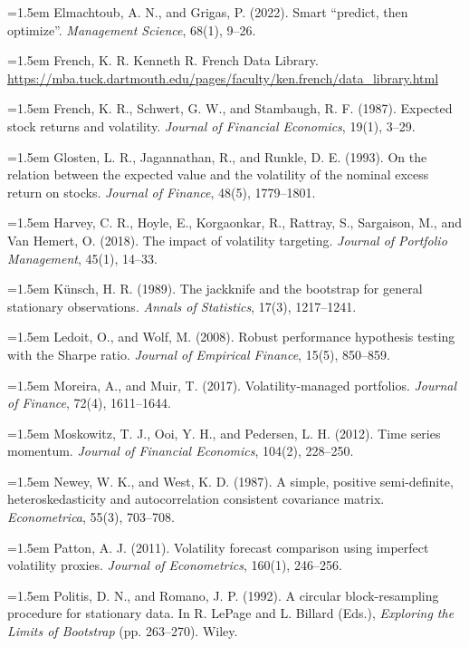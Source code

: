 \hangindent=1.5em Elmachtoub, A. N., and Grigas, P. (2022). Smart ``predict, then optimize''. \textit{Management Science}, 68(1), 9--26.\par\smallskip
\hangindent=1.5em French, K. R. Kenneth R. French Data Library. \url{https://mba.tuck.dartmouth.edu/pages/faculty/ken.french/data_library.html}\par\smallskip
\hangindent=1.5em French, K. R., Schwert, G. W., and Stambaugh, R. F. (1987). Expected stock returns and volatility. \textit{Journal of Financial Economics}, 19(1), 3--29.\par\smallskip
\hangindent=1.5em Glosten, L. R., Jagannathan, R., and Runkle, D. E. (1993). On the relation between the expected value and the volatility of the nominal excess return on stocks. \textit{Journal of Finance}, 48(5), 1779--1801.\par\smallskip
\hangindent=1.5em Harvey, C. R., Hoyle, E., Korgaonkar, R., Rattray, S., Sargaison, M., and Van Hemert, O. (2018). The impact of volatility targeting. \textit{Journal of Portfolio Management}, 45(1), 14--33.\par\smallskip
\hangindent=1.5em Künsch, H. R. (1989). The jackknife and the bootstrap for general stationary observations. \textit{Annals of Statistics}, 17(3), 1217--1241.\par\smallskip
\hangindent=1.5em Ledoit, O., and Wolf, M. (2008). Robust performance hypothesis testing with the Sharpe ratio. \textit{Journal of Empirical Finance}, 15(5), 850--859.\par\smallskip
\hangindent=1.5em Moreira, A., and Muir, T. (2017). Volatility-managed portfolios. \textit{Journal of Finance}, 72(4), 1611--1644.\par\smallskip
\hangindent=1.5em Moskowitz, T. J., Ooi, Y. H., and Pedersen, L. H. (2012). Time series momentum. \textit{Journal of Financial Economics}, 104(2), 228--250.\par\smallskip
\hangindent=1.5em Newey, W. K., and West, K. D. (1987). A simple, positive semi-definite, heteroskedasticity and autocorrelation consistent covariance matrix. \textit{Econometrica}, 55(3), 703--708.\par\smallskip
\hangindent=1.5em Patton, A. J. (2011). Volatility forecast comparison using imperfect volatility proxies. \textit{Journal of Econometrics}, 160(1), 246--256.\par\smallskip
\hangindent=1.5em Politis, D. N., and Romano, J. P. (1992). A circular block-resampling procedure for stationary data. In R. LePage and L. Billard (Eds.), \textit{Exploring the Limits of Bootstrap} (pp. 263--270). Wiley.\par\smallskip
